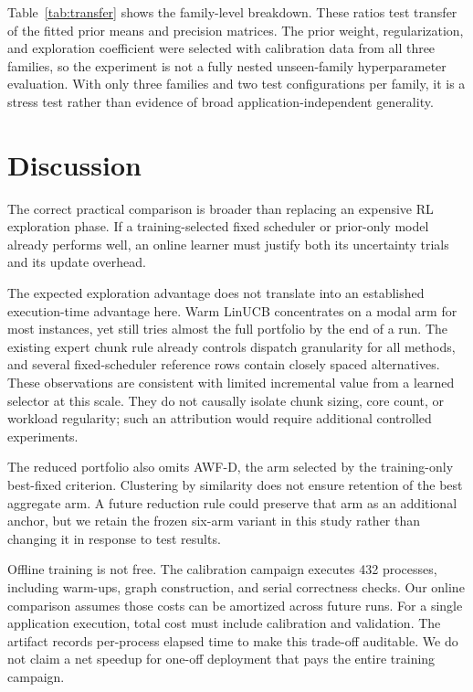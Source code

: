 \documentclass[10pt,letterpaper]{article}
\begin{document}
\TransferDiscussion{}
Table~\ref{tab:transfer} shows the family-level breakdown. These ratios
test transfer of the fitted prior means and precision matrices. The prior weight,
regularization, and exploration coefficient were selected with calibration data
from all three families, so the
experiment is not a fully nested unseen-family hyperparameter evaluation.
With only three families and two test configurations per family, it is a
stress test rather than evidence of broad application-independent generality.


\section{Discussion}

The correct practical comparison is broader than replacing an expensive RL
exploration phase. If a training-selected fixed scheduler or prior-only model
already performs well, an online learner must justify both its uncertainty
trials and its update overhead. \PracticalDiscussion{}

The expected exploration advantage does not translate into an established
execution-time advantage here. Warm LinUCB concentrates on a modal arm for
most instances, yet still tries almost the full portfolio by the end of a run.
The existing expert chunk rule already controls dispatch granularity for all
methods, and several fixed-scheduler reference rows contain closely spaced
alternatives. These observations are consistent with limited incremental
value from a learned selector at this scale. They do not causally isolate
chunk sizing, core count, or workload regularity; such an attribution would
require additional controlled experiments.

The reduced portfolio also omits AWF-D, the arm selected by the training-only
best-fixed criterion. Clustering by similarity does not ensure retention of
the best aggregate arm. A future reduction rule could preserve that arm as an
additional anchor, but we retain the frozen six-arm variant in this study
rather than changing it in response to test results.

Offline training is not free. The calibration campaign executes 432 processes,
including warm-ups, graph construction, and serial correctness checks. Our
online comparison assumes those costs can be amortized across future runs.
For a single application execution, total cost must include calibration and
validation. The artifact records per-process elapsed time to make this trade-off
auditable. We do not claim a net speedup for one-off deployment that pays the
entire training campaign.
\end{document}
